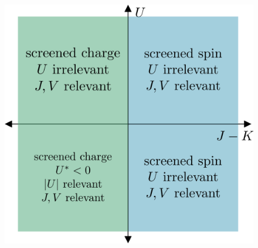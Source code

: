 \documentclass[12pt,twoside]{article}
\numberwithin{equation}{section}
\begin{document}
\begin{figure}[htpb]
	\centering
	\includegraphics[scale=0.4]{../figures/phases_V.png}
	\caption{}
\end{figure}
\end{document}
